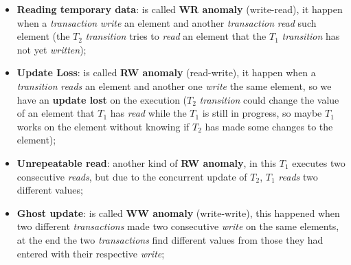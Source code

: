 \documentclass{article}
\begin{document}
\begin{itemize}
\item \textbf{Reading temporary data}: is called \textbf{WR anomaly} (write-read), it happen when a \emph{transaction} \emph{write} an element and another \emph{transaction} \emph{read} such element (the $T_{2}$ \emph{transition} tries to \emph{read} an element that the $T_{1}$ \emph{transition} has not yet \emph{written});
\item \textbf{Update Loss}: is called \textbf{RW anomaly} (read-write), it happen when a \emph{transition} \emph{reads} an element and another one \emph{write} the same element, so we have an \textbf{update lost} on the execution ($T_{2}$ \emph{transition} could change the value of an element that $T_{1}$ has \emph{read} while the $T_{1}$ is still in progress, so maybe $T_{1}$ works on the element without knowing if  $T_{2}$ has made some changes to the element);
\item \textbf{Unrepeatable read}: another kind of \textbf{RW anomaly}, in this $T_{1}$ executes two consecutive \emph{reads}, but due to the concurrent update of $T_{2}$, $T_{1}$ \emph{reads} two different values;
\item \textbf{Ghost update}: is called \textbf{WW anomaly} (write-write), this happened when two different \emph{transactions} made two consecutive \emph{write} on the same elements, at the end the two \emph{transactions} find different values from those they had entered with their respective \emph{write};
\end{itemize}
\end{document}
